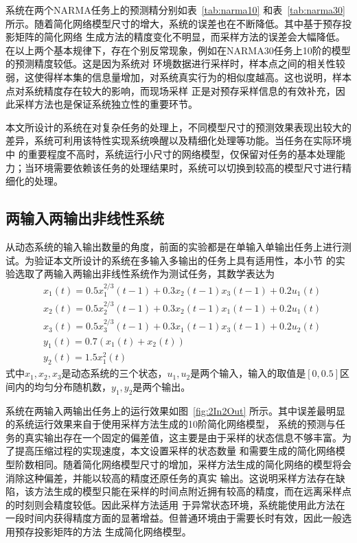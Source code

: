 系统在两个NARMA任务上的预测精分别如表~\ref{tab:narma10} 和表~\ref{tab:narma30} 所示。随着简化网络模型尺寸的增大，系统的误差也在不断降低。其中基于预存投影矩阵的简化网络
生成方法的精度变化不明显，而采样方法的误差会大幅降低。在以上两个基本规律下，存在个别反常现象，例如在NARMA30任务上10阶的模型的预测精度较低。这是因为系统对
环境数据进行采样时，样本点之间的相关性较弱，这使得样本集的信息量增加，对系统真实行为的相似度越高。这也说明，样本点对系统精度存在较大的影响，而现场采样
正是对预存采样信息的有效补充，因此采样方法也是保证系统独立性的重要环节。

本文所设计的系统在对复杂任务的处理上，不同模型尺寸的预测效果表现出较大的差异，系统可利用该特性实现系统唤醒以及精细化处理等功能。当任务在实际环境中
的重要程度不高时，系统运行小尺寸的网络模型，仅保留对任务的基本处理能力；当环境需要依赖该任务的处理结果时，系统可以切换到较高的模型尺寸进行精细化的处理。

\subsection{两输入两输出非线性系统}
从动态系统的输入输出数量的角度，前面的实验都是在单输入单输出任务上进行测试。为验证本文所设计的系统在多输入多输出的任务上具有适用性，本小节
的实验选取了两输入两输出非线性系统作为测试任务，其数学表达为
\begin{equation}
	\begin{split}
		&x_1(t) = 0.5x_1^{2/3}(t-1) + 0.3x_2(t-1)x_3(t-1) + 0.2u_1(t)	\\
		&x_2(t) = 0.5x_2^{2/3}(t-1) + 0.3x_2(t-1)x_1(t-1) + 0.2u_1(t)	\\
		&x_3(t) = 0.5x_3^{2/3}(t-1) + 0.3x_1(t-1)x_3(t-1) + 0.2u_2(t)	\\
		&y_1(t) = 0.7(x_1(t) + x_2(t))									\\
		&y_2(t) = 1.5x_1^{2}(t)	
	\end{split}
\label{eq:2In2Out}
\end{equation}
式中\(x_1,x_2,x_3\)是动态系统的三个状态，\(u_1,u_2\)是两个输入，输入的取值是\([0,0.5]\)区间内的均匀分布随机数，\(y_1,y_2\)是两个输出。

系统在两输入两输出任务上的运行效果如图~\ref{fig:2In2Out} 所示。其中误差最明显的系统运行效果来自于使用采样方法生成的10阶简化网络模型，
系统的预测与任务的真实输出存在一个固定的偏差值，这主要是由于采样的状态信息不够丰富。为了提高压缩过程的实现速度，本文设置采样的状态数量
和需要生成的简化网络模型阶数相同。随着简化网络模型尺寸的增加，采样方法生成的简化网络的模型将会消除这种偏差，并能以较高的精度还原任务的真实
输出。这说明采样方法存在缺陷，该方法生成的模型只能在采样的时间点附近拥有较高的精度，而在远离采样点的时刻则会精度较低。因此采样方法适用
于异常状态环境，系统能使用此方法在一段时间内获得精度方面的显著增益。但普通环境由于需要长时有效，因此一般选用预存投影矩阵的方法
生成简化网络模型。

